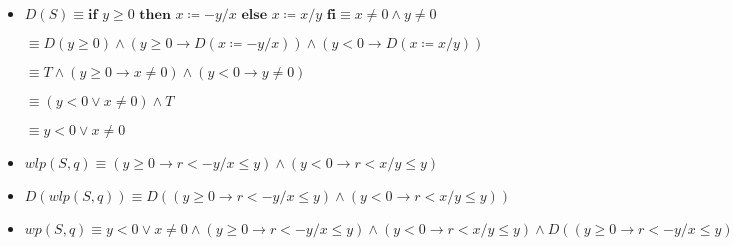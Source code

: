 \documentclass{article}
\begin{document}
\begin{itemize}
    \item $D(S) \equiv \textbf{if } y \geq 0 \textbf{ then } x \coloneqq -y/x \textbf{ else } x \coloneqq x/y \textbf{ fi} \equiv x \neq 0 \wedge y \neq 0$

    \qquad \qquad $\equiv D(y \geq 0) \wedge (y \geq 0 \rightarrow D( x \coloneqq -y/x)) \wedge (y < 0 \rightarrow D(x \coloneqq x/y))$

    \qquad \qquad $\equiv T \wedge (y \geq 0 \rightarrow x \neq 0) \wedge (y < 0 \rightarrow y \neq 0)$

    \qquad \qquad $\equiv (y < 0 \lor x \neq 0) \wedge T$

    \qquad \qquad $\equiv y < 0 \lor x \neq 0$

    \item $wlp(S,q) \equiv (y \geq 0 \rightarrow r<-y/x \leq y) \wedge (y < 0 \rightarrow r<x/y \leq y)$
    \item $D(wlp(S,q)) \equiv D((y \geq 0 \rightarrow r<-y/x \leq y) \wedge (y < 0 \rightarrow r<x/y \leq y))$
    \item $wp(S,q) \equiv y < 0 \lor x \neq 0 \wedge (y \geq 0 \rightarrow r<-y/x \leq y) \wedge (y < 0 \rightarrow r<x/y \leq y) \wedge D((y \geq 0 \rightarrow r<-y/x \leq y) \wedge (y < 0 \rightarrow r<x/y \leq y))$

\end{itemize}
\end{document}
